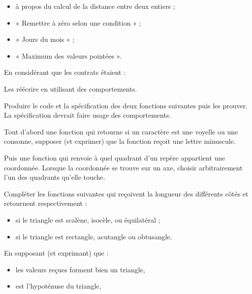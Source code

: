 \begin{itemize}
\item à propos du calcul de la distance entre deux entiers ;
\item « Remettre à zéro selon une condition » ;
\item « Jours du mois » ;
\item « Maximum des valeurs pointées ».
\end{itemize}


En considérant que les contrats étaient :




Les réécrire en utilisant des comportements.




Produire le code et la spécification des deux fonctions suivantes puis
les prouver. La spécification devrait faire usage des comportements.


Tout d'abord une fonction qui retourne si un caractère est une voyelle
ou une consonne, supposer (et exprimer) que la fonction reçoit une
lettre minuscule.




Puis une fonction qui renvoie à quel quadrant d'un repère appartient
une coordonnée. Lorsque la coordonnée se trouve sur un axe, choisir
arbitrairement l'un des quadrants qu'elle touche.






Compléter les fonctions suivantes qui reçoivent la longueur des différents
côtés et retournent respectivement :


\begin{itemize}
\item si le triangle est scalène, isocèle, ou équilatéral ;
\item si le triangle est rectangle, acutangle ou obtusangle.
\end{itemize}




En supposant (et exprimant) que :


\begin{itemize}
\item les valeurs reçues forment bien un triangle,
\item {} est l'hypoténuse du triangle,
\end{itemize}


